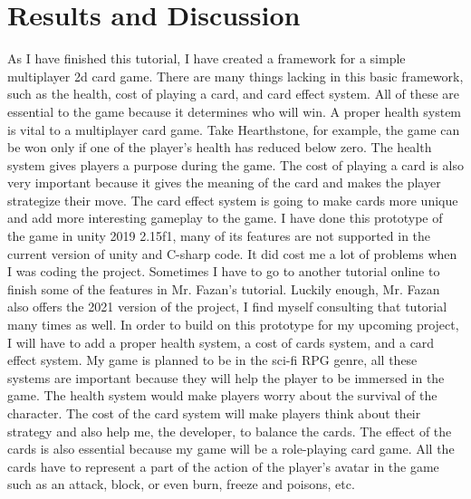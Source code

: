 \documentclass[10pt,twocolumn]{article}
\begin{document}
\section{Results and Discussion}
As I have finished this tutorial, I have created a framework for a simple multiplayer 2d card game. There are many things lacking in this basic framework, such as the health, cost of playing a card, and card effect system. All of these are essential to the game because it determines who will win. A proper health system is vital to a multiplayer card game. Take Hearthstone, for example, the game can be won only if one of the player’s health has reduced below zero. The health system gives players a purpose during the game. The cost of playing a card is also very important because it gives the meaning of the card and makes the player strategize their move. The card effect system is going to make cards more unique and add more interesting gameplay to the game.  I have done this prototype of the game in unity  2019 2.15f1, many of its features are not supported in the current version of unity and C-sharp code. It did cost me a lot of problems when I was coding the project. Sometimes I have to go to another tutorial online to finish some of the features in Mr. Fazan’s tutorial. Luckily enough, Mr. Fazan also offers the 2021 version of the project, I find myself consulting that tutorial many times as well. In order to build on this prototype for my upcoming project, I will have to add a proper health system, a cost of cards system, and a card effect system. My game is planned to be in the sci-fi RPG genre, all these systems are important because they will help the player to be immersed in the game. The health system would make players worry about the survival of the character. The cost of the card system will make players think about their strategy and also help me, the developer, to balance the cards. The effect of the cards is also essential because my game will be a role-playing card game. All the cards have to represent a part of the action of the player’s avatar in the game such as an attack, block, or even burn, freeze and poisons, etc.    
\end{document}
